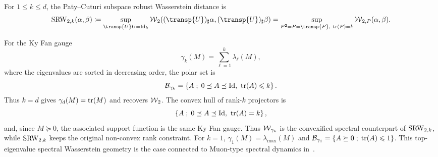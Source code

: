\begin{defn}\label{def-subspace-robust-wasserstein}
	For $1\leq k\leq d$, the Paty--Cuturi subspace robust Wasserstein distance is
	\[
		\SRW_{2,k}(\alpha,\beta)
		\eqdef
		\sup_{\transp{U}U=\Id_k}
		\Wass_2((\transp{U})_\sharp\alpha,(\transp{U})_\sharp\beta)
		=
		\sup_{P^2=P=\transp{P},\ \tr(P)=k}\Wass_{2,P}(\alpha,\beta).
	\]
\end{defn}

For the Ky Fan gauge
\[
	\gamma_k(M)=\sum_{\ell=1}^k\lambda_\ell(M),
\]
where the eigenvalues are sorted in decreasing order, the polar set is
\[
	\mathcal B_{\gamma_k}=\left\{ A \;;\; 0\preceq A\preceq\mathrm{Id},\ \operatorname{tr}(A)\leqslant k \right\}.
\]
Thus $k=d$ gives $\gamma_d(M)=\operatorname{tr}(M)$ and recovers $\operatorname{\mathcal{W}}_2$. The convex hull of rank-$k$ projectors is
\[
	\left\{ A \;;\; 0\preceq A\preceq\mathrm{Id},\ \operatorname{tr}(A)=k \right\},
\]
and, since $M\succeq0$, the associated support function is the same Ky Fan gauge. Thus $\operatorname{\mathcal{W}}_{\gamma_k}$ is the convexified spectral counterpart of $\operatorname{SRW}_{2,k}$, while $\operatorname{SRW}_{2,k}$ keeps the original non-convex rank constraint. For $k=1$, $\gamma_1(M)=\lambda_{\max}(M)$ and $\mathcal B_{\gamma_1}=\left\{ A\succeq0 \;;\; \operatorname{tr}(A)\leqslant1 \right\}$.
This top-eigenvalue spectral Wasserstein geometry is the case connected to Muon-type spectral dynamics in~\cite{peyre2026muon}.

